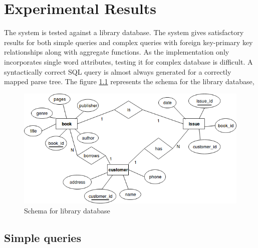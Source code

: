 \chapter{Experimental Results}

The system is tested against a library database. The system gives satisfactory results for both simple queries and complex queries with foreign key-primary key relationships along with aggregate functions. As the implementation only incorporates single word attributes, testing it for complex database is difficult. A syntactically correct SQL query is almost always generated for a correctly mapped parse tree. The figure \ref{fig:schema} represents the schema for the library database,\\

\begin{figure}[htb]
\centering
\includegraphics[scale=0.55]{./er} %
\caption{Schema for library database}
\label{fig:schema} %
\end{figure}




\section{Simple queries}


